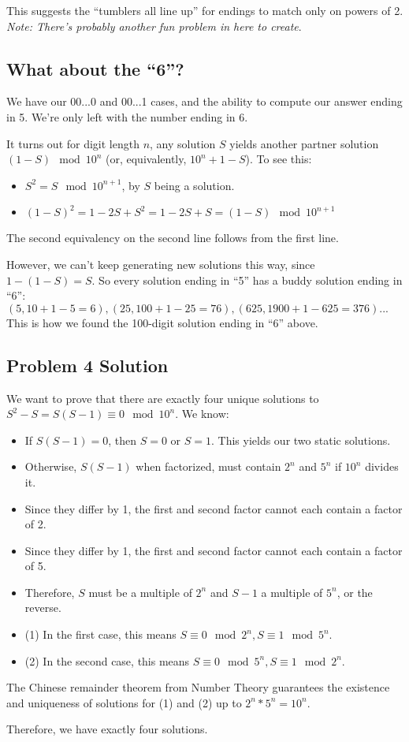 \documentclass[11pt, oneside]{article} 	%
\begin{document}
This suggests the ``tumblers all line up'' for endings to match only on powers of 2.  \emph{Note: There's probably another fun problem in here to create}.

\subsection{What about the ``6''?}

We have our 00...0 and 00...1 cases, and the ability to compute our answer ending in 5.  We're only left with the number ending in 6.

It turns out for digit length $n$, any solution $S$ yields another partner solution $(1 - S) \mod 10^n$ (or, equivalently, $10^n + 1 - S$).  To see this:

\begin{itemize}
\item $S^2 = S  \mod 10^{n+1}$, by $S$ being a solution.
\item $(1-S)^2 = 1-2S+S^2 = 1-2S+S = (1-S) \mod 10^{n+1}$
\end{itemize}

The second equivalency on the second line follows from the first line.

However, we can't keep generating new solutions this way, since $1 - (1 - S) = S$.  So every solution ending in ``5'' has a buddy solution ending in ``6'': $(5, 10 + 1 - 5 = 6), (25, 100 + 1 - 25 = 76), (625, 1900 +1 - 625 = 376)...$ This is how we found the 100-digit solution ending in ``6'' above.

\subsection{Problem 4 Solution}

We want to prove that there are exactly four unique solutions to $S^2 - S = S(S-1) \equiv 0 \mod 10^n$.  We know:

\begin{itemize}
\item If $S(S-1) = 0$, then $S = 0$ or $S = 1$.  This yields our two static solutions.
\item Otherwise, $S(S-1)$ when factorized, must contain $2^n$ and $5^n$ if $10^n$ divides it.
\item Since they differ by 1, the first and second factor cannot each contain a factor of 2.
\item  Since they differ by 1, the first and second factor cannot each contain a factor of 5.
\item Therefore, $S$ must be a multiple of $2^n$ and $S-1$ a multiple of $5^n$, or the reverse.
\item (1) In the first case, this means $S \equiv 0 \mod 2^n, S \equiv 1 \mod 5^n$.
\item (2) In the second case, this means $S \equiv 0 \mod 5^n, S \equiv 1 \mod 2^n$.
\end{itemize}

The Chinese remainder theorem from Number Theory guarantees the existence and uniqueness of solutions for (1) and (2) up to $2^n*5^n = 10^n$.

Therefore, we have exactly four solutions.
\end{document}
